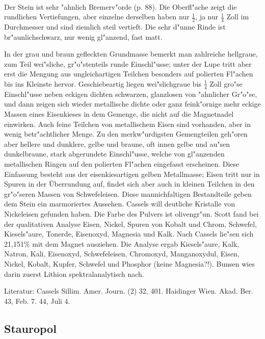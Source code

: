 \documentclass[a4paper, 11pt, oneside]{article}
\begin{document}
\paragraph{}
Der Stein ist sehr "ahnlich Bremerv"orde (p. 88). Die Oberfl"ache zeigt die rundlichen Vertiefungen, aber einzelne derselben haben nur $\frac{1}{2}$, ja nur $\frac{1}{4}$ Zoll im Durchmesser und sind ziemlich steil vertieft. Die sehr d"unne Rinde ist br"aunlichschwarz, nur wenig gl"anzend, fast matt.

In der grau und braun gefleckten Grundmasse bemerkt man zahlreiche hellgraue, zum Teil wei"sliche, gr"o"stenteils runde Einschl"usse; unter der Lupe tritt aber erst die Mengung aus ungleichartigen Teilchen besonders auf polierten Fl"achen bis ins Kleinste hervor. Geschiebeartig liegen wei"slichgraue bis $\frac{1}{4}$ Zoll gro"se Einschl"usse neben eckigen dichten schwarzen, glanzlosen von "ahnlicher Gr"o"se, und dann zeigen sich wieder metallische dichte oder ganz feink"ornige mehr eckige Massen eines Eisenkieses in dem Gemenge, die nicht auf die Magnetnadel einwirken. Auch feine Teilchen von metallischem Eisen sind vorhanden, aber in wenig betr"achtlicher Menge. Zu den merkw"urdigsten Gemengteilen geh"oren aber hellere und dunklere, gelbe und braune, oft innen gelbe und au"sen dunkelbraune, stark abgerundete Einschl"usse, welche von gl"anzenden metallischen Ringen auf den polierten Fl"achen eingefasst erscheinen. Diese Einfassung besteht aus der eisenkiesartigen gelben Metallmasse; Eisen tritt nur in Spuren in der Überrundung auf, findet sich aber auch in kleinen Teilchen in den gr"o"seren Massen von Schwefeleisen. Diese mannichfaltigen Bestandteile geben dem Stein ein marmoriertes Aussehen. Cassels will deutliche Kristalle von Nickeleisen gefunden haben. Die Farbe des Pulvers ist olivengr"un. Scott fand bei der qualitativen Analyse Eisen, Nickel, Spuren von Kobalt und Chrom, Schwefel, Kiesels"aure, Tonerde, Eisenoxyd, Magnesia und Kalk. Nach Cassels lie"sen sich 21,151\% mit dem Magnet ausziehen. Die Analyse ergab Kiesels"aure, Kalk, Natron, Kali, Eisenoxyd, Schwefeleisen, Chromoxyd, Manganoxydul, Eisen, Nickel, Kobalt, Kupfer, Schwefel und Phosphor (keine Magnesia?!). Bunsen wies darin zuerst Lithion spektralanalytisch nach.

\footnotesize
Literatur: Cassels Sillim. Amer. Journ. (2) 32, 401. Haidinger Wien. Akad. Ber. 43, Feb. 7. 44, Juli 4.

\subsection{Stauropol}
\normalsize
\end{document}
